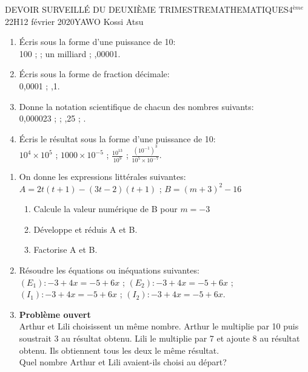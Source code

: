 \documentclass[12pt,a4paper]{book}
\newcommand{\prof}{YAWO Kossi Atsu}
\newcommand{\matiere}{MATHEMATIQUES}
\newcommand{\classe}{4$^{ème}$}
\begin{document}
\newpage
\begin{devoir}{DEVOIR SURVEILLÉ DU DEUXIÈME TRIMESTRE}{\matiere}{\classe}{2}{2H}{12 février 2020}{\prof}
\begin{exo}[7]
\begin{enumerate}
\item Écris sous la forme d'une puissance de 10:\\
100 \qquad ;  \qquad ; \qquad un milliard \qquad ; ,00001.
\item Écris sous la forme de fraction décimale:\\
0,0001 \qquad ; ,1.
\item Donne la notation scientifique de chacun des nombres suivants:\\
0,000023 \qquad ;  \qquad ; ,25 \qquad ; .
\item Écris le résultat sous la forme d'une puissance de 10:\\
$10^4 \times 10^5$ \qquad ; \qquad $1000 \times 10^{-5}$ \qquad ; \qquad $\frac{10^{13}}{10^9}$ \qquad ; \qquad $\frac{(10^{-1})^3}{10^5 \times 10^{-7}}$.
\end{enumerate}
\end{exo}

\begin{exo}[7]
\begin{enumerate}
\item On donne les expressions littérales suivantes:
$A=2t(t+1)-(3t-2)(t+1)$ \qquad ; \qquad $B=(m+3)^2-16$
\begin{enumerate}
\item Calcule la valeur numérique de B pour $m=-3$
\item Développe et réduis A et B.
\item Factorise A et B.
\end{enumerate}
\item Résoudre les équations ou inéquations suivantes:\\
$(E_1): -3+4x=-5+6x$ \qquad ; \qquad $(E_2): -3+4x=-5+6x$ \qquad ; \qquad $(I_1): -3+4x=-5+6x$ \qquad ; \qquad $(I_2): -3+4x=-5+6x$.
\item \textbf{Problème ouvert}\\
Arthur et Lili choisissent un même nombre. Arthur le multiplie par 10 puis soustrait 3 au résultat obtenu. Lili le multiplie par 7 et ajoute 8 au résultat obtenu. Ils obtiennent tous les deux le même résultat.\\
Quel nombre Arthur et Lili avaient-ils choisi au départ?
\end{enumerate}
\end{exo}


\end{devoir}
\end{document}
